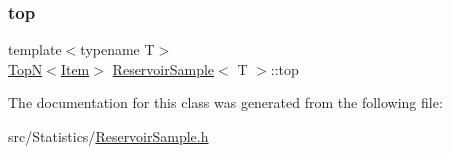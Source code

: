 \mbox{\label{class_reservoir_sample_a94a92f438328cbca4aa5f0ba92867142}} 
\subsubsection{\texorpdfstring{top}{top}}
{\footnotesize\ttfamily template$<$typename T$>$ \\
\hyperlink{class_top_n}{TopN}$<$\hyperlink{class_reservoir_sample_1_1_item}{Item}$>$ \hyperlink{class_reservoir_sample}{Reservoir\+Sample}$<$ T $>$\+::top}



The documentation for this class was generated from the following file\+:\begin{DoxyCompactItemize}
\item 
src/\+Statistics/\hyperlink{_reservoir_sample_8h}{Reservoir\+Sample.\+h}\end{DoxyCompactItemize}
